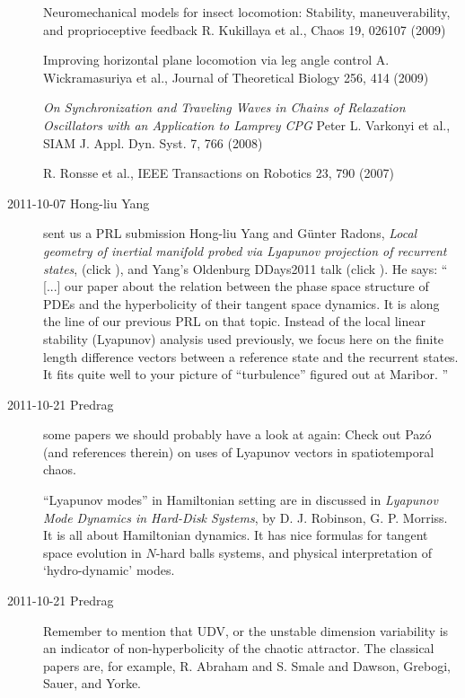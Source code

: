 \begin{description}
    Neuromechanical models for insect locomotion: Stability, maneuverability, and proprioceptive feedback
    R. Kukillaya et al., Chaos 19, 026107 (2009)

    Improving horizontal plane locomotion via leg angle control
    A. Wickramasuriya et al., Journal of Theoretical Biology 256, 414 (2009)

\emph{On Synchronization and Traveling Waves in Chains of Relaxation
Oscillators with an Application to Lamprey CPG}
    Peter L. Varkonyi et al., SIAM J. Appl. Dyn. Syst. 7, 766 (2008)

    R. Ronsse et al., IEEE Transactions on Robotics 23, 790 (2007)

\item[2011-10-07 Hong-liu Yang] sent us a PRL submission
Hong-liu Yang and G\"unter Radons,
\emph{Local geometry of inertial manifold probed via Lyapunov projection of recurrent
states},
(click ),
and Yang's Oldenburg DDays2011 talk
(click ). He says:
``
[...] our paper about the relation between
the phase space structure of PDEs and the hyperbolicity of their tangent
space dynamics. It is along the line of our previous PRL on that topic.
Instead of the local linear stability (Lyapunov) analysis used
previously, we focus here on the finite length difference vectors between
a reference state and the recurrent states. It fits quite well to your
picture of ``turbulence'' figured out at Maribor.
''

\item[2011-10-21 Predrag] some papers we should probably have a look at
again: Check out Paz\'o  (and references
therein) on uses of Lyapunov vectors in spatiotemporal chaos.

``Lyapunov modes'' in Hamiltonian setting are in discussed in
\emph{Lyapunov Mode Dynamics in Hard-Disk Systems}, by D. J. Robinson, G.
P. Morriss. It is all about Hamiltonian dynamics. It has nice
formulas for tangent space evolution in $N$-hard balls systems, and
physical interpretation of `hydro-dynamic' modes.

\item[2011-10-21 Predrag] Remember to mention that UDV, or the unstable
dimension variability is an indicator of
non-hyperbolicity of the chaotic attractor. The classical papers are, for
example, R. Abraham and S. Smale and Dawson, Grebogi, Sauer,
and Yorke.


\end{description}
